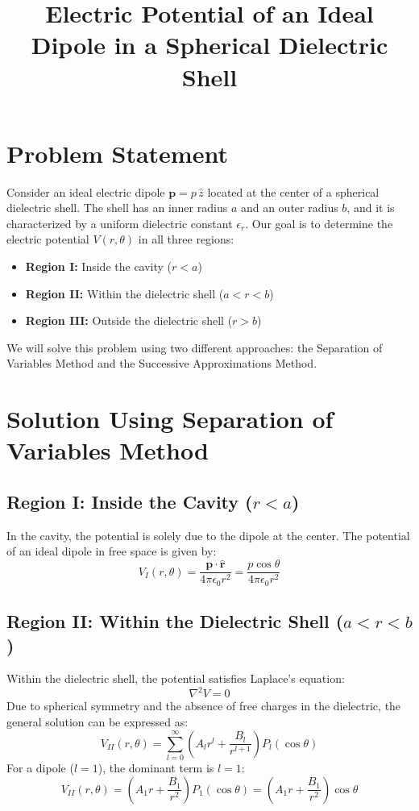 \documentclass[12pt]{article}
\title{Electric Potential of an Ideal Dipole in a Spherical Dielectric Shell}
\author{}
\date{}
\begin{document}
\maketitle

\section*{Problem Statement}

Consider an ideal electric dipole \(\mathbf{p} = p\,\hat{z}\) located at the center of a spherical dielectric shell. The shell has an inner radius \(a\) and an outer radius \(b\), and it is characterized by a uniform dielectric constant \(\epsilon_r\). Our goal is to determine the electric potential \(V(r, \theta)\) in all three regions:

\begin{itemize}
    \item \textbf{Region I:} Inside the cavity (\(r < a\))
    \item \textbf{Region II:} Within the dielectric shell (\(a < r < b\))
    \item \textbf{Region III:} Outside the dielectric shell (\(r > b\))
\end{itemize}

We will solve this problem using two different approaches: the Separation of Variables Method and the Successive Approximations Method.

\section*{Solution Using Separation of Variables Method}

\subsection*{Region I: Inside the Cavity (\(r < a\))}

In the cavity, the potential is solely due to the dipole at the center. The potential of an ideal dipole in free space is given by:
\[
V_I(r, \theta) = \frac{\mathbf{p} \cdot \hat{\mathbf{r}}}{4\pi \epsilon_0 r^2} = \frac{p \cos \theta}{4\pi \epsilon_0 r^2}
\]

\subsection*{Region II: Within the Dielectric Shell (\(a < r < b\))}

Within the dielectric shell, the potential satisfies Laplace's equation:
\[
\nabla^2 V = 0
\]
Due to spherical symmetry and the absence of free charges in the dielectric, the general solution can be expressed as:
\[
V_{II}(r, \theta) = \sum_{l=0}^{\infty} \left( A_l r^l + \frac{B_l}{r^{l+1}} \right) P_l(\cos \theta)
\]
For a dipole (\(l = 1\)), the dominant term is \(l = 1\):
\[
V_{II}(r, \theta) = \left( A_1 r + \frac{B_1}{r^2} \right) P_1(\cos \theta) = \left( A_1 r + \frac{B_1}{r^2} \right) \cos \theta
\]
\end{document}
